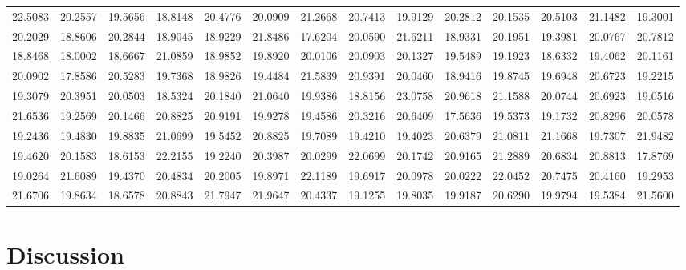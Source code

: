 \documentclass[12pt]{article}\usepackage[]{graphicx}\usepackage[]{color}
\begin{document}
\begin{landscape}
\begin{longtable}[t]{rrrrrrrrrrrrrr}
22.5083 & 20.2557 & 19.5656 & 18.8148 & 20.4776 & 20.0909 & 21.2668 & 20.7413 & 19.9129 & 20.2812 & 20.1535 & 20.5103 & 21.1482 & 19.3001\\
20.2029 & 18.8606 & 20.2844 & 18.9045 & 18.9229 & 21.8486 & 17.6204 & 20.0590 & 21.6211 & 18.9331 & 20.1951 & 19.3981 & 20.0767 & 20.7812\\
18.8468 & 18.0002 & 18.6667 & 21.0859 & 18.9852 & 19.8920 & 20.0106 & 20.0903 & 20.1327 & 19.5489 & 19.1923 & 18.6332 & 19.4062 & 20.1161\\
20.0902 & 17.8586 & 20.5283 & 19.7368 & 18.9826 & 19.4484 & 21.5839 & 20.9391 & 20.0460 & 18.9416 & 19.8745 & 19.6948 & 20.6723 & 19.2215\\
19.3079 & 20.3951 & 20.0503 & 18.5324 & 20.1840 & 21.0640 & 19.9386 & 18.8156 & 23.0758 & 20.9618 & 21.1588 & 20.0744 & 20.6923 & 19.0516\\
21.6536 & 19.2569 & 20.1466 & 20.8825 & 20.9191 & 19.9278 & 19.4586 & 20.3216 & 20.6409 & 17.5636 & 19.5373 & 19.1732 & 20.8296 & 20.0578\\
19.2436 & 19.4830 & 19.8835 & 21.0699 & 19.5452 & 20.8825 & 19.7089 & 19.4210 & 19.4023 & 20.6379 & 21.0811 & 21.1668 & 19.7307 & 21.9482\\
19.4620 & 20.1583 & 18.6153 & 22.2155 & 19.2240 & 20.3987 & 20.0299 & 22.0699 & 20.1742 & 20.9165 & 21.2889 & 20.6834 & 20.8813 & 17.8769\\
19.0264 & 21.6089 & 19.4370 & 20.4834 & 20.2005 & 19.8971 & 22.1189 & 19.6917 & 20.0978 & 20.0222 & 22.0452 & 20.7475 & 20.4160 & 19.2953\\
21.6706 & 19.8634 & 18.6578 & 20.8843 & 21.7947 & 21.9647 & 20.4337 & 19.1255 & 19.8035 & 19.9187 & 20.6290 & 19.9794 & 19.5384 & 21.5600\\*
\end{longtable}
\end{landscape}
\endgroup{}

\hypertarget{discussion}{%
\section{Discussion}\label{discussion}}
\end{document}
